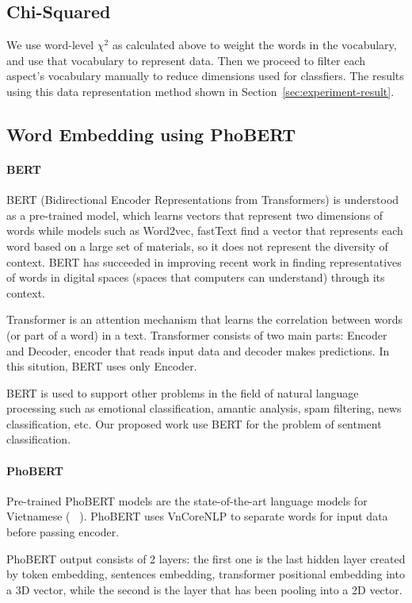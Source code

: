 \subsection{Chi-Squared}
We use word-level \(\chi^{2}\) as calculated above to weight the words in the vocabulary, and use that vocabulary to represent data. Then we proceed to filter each aspect's vocabulary manually to reduce dimensions used for classfiers. The results using this data representation method shown in Section~\ref{sec:experiment-result}.

\subsection{Word Embedding using PhoBERT}
\label{subsec:word-embedding}
\paragraph{BERT}
BERT (Bidirectional Encoder Representations from Transformers) is understood as a pre-trained model, which learns vectors that represent two dimensions of words while models such as Word2vec, fastText find a vector that represents each word based on a large set of materials, so it does not represent the diversity of context. BERT has succeeded in improving recent work in finding representatives of words in digital spaces (spaces that computers can understand) through its context. 

Transformer is an attention mechanism that learns the correlation between words (or part of a word) in a text. Transformer consists of two main parts: Encoder and Decoder, encoder that reads input data and decoder makes predictions. In this sitution, BERT uses only Encoder.

BERT is used to support other problems in the field of natural language processing such as emotional classification, amantic analysis, spam filtering, news classification, etc. Our proposed work use BERT for the problem of sentment classification.

\paragraph{PhoBERT}
Pre-trained PhoBERT models are the state-of-the-art language models for Vietnamese (\citeauthor{phobert}~ \cite{phobert}). PhoBERT uses VnCoreNLP to separate words for input data before passing encoder.

PhoBERT output consists of 2 layers: the first one is the last hidden layer created by token embedding, sentences embedding, transformer positional embedding into a 3D vector, while the second is the layer that has been pooling into a 2D vector.

